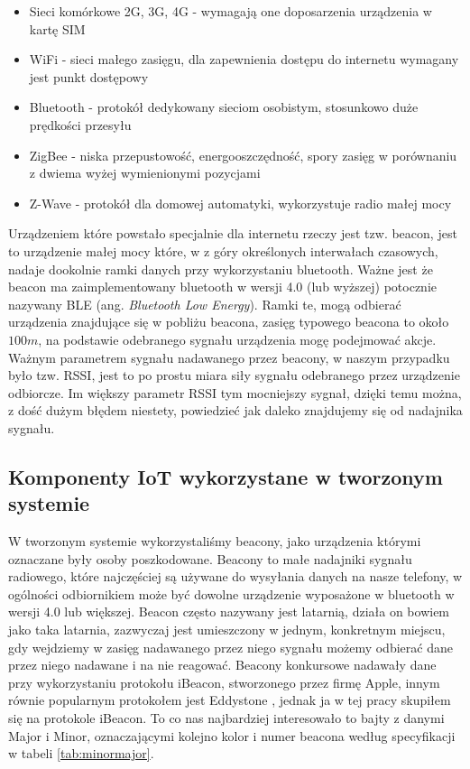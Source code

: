 \begin{itemize}
	\item{Sieci komórkowe 2G, 3G, 4G - wymagają one doposarzenia urządzenia w kartę SIM}
	\item{WiFi - sieci małego zasięgu, dla zapewnienia dostępu do internetu wymagany jest punkt dostępowy}
	\item{Bluetooth - protokół dedykowany sieciom osobistym, stosunkowo duże prędkości przesyłu}
	\item{ZigBee - niska przepustowość, energooszczędność, spory zasięg w porównaniu z dwiema wyżej wymienionymi pozycjami}
	\item{Z-Wave - protokół dla domowej automatyki, wykorzystuje radio małej mocy}
\end{itemize}

Urządzeniem które powstało specjalnie dla internetu rzeczy jest tzw. beacon, jest to urządzenie małej mocy które, w z góry określonych interwałach czasowych, nadaje dookolnie ramki danych przy wykorzystaniu bluetooth. Ważne jest że beacon ma zaimplementowany bluetooth w wersji 4.0 (lub wyższej) potocznie nazywany BLE (ang. \textit{Bluetooth Low Energy}). Ramki te, mogą odbierać urządzenia znajdujące się w pobliżu beacona, zasięg typowego beacona to około $100 m$, na podstawie odebranego sygnału urządzenia mogę podejmować akcje. Ważnym parametrem sygnału nadawanego przez beacony, w naszym przypadku było tzw. RSSI, jest to po prostu miara siły sygnału odebranego przez urządzenie odbiorcze. Im większy parametr RSSI tym mocniejszy sygnał, dzięki temu można, z dość dużym błędem niestety, powiedzieć jak daleko znajdujemy się od nadajnika sygnału.

\subsection{Komponenty IoT wykorzystane w tworzonym systemie}

W tworzonym systemie wykorzystaliśmy beacony, jako urządzenia którymi oznaczane były osoby poszkodowane. Beacony to małe nadajniki sygnału radiowego, które najczęściej są używane do wysyłania danych na nasze telefony, w ogólności odbiornikiem może być dowolne urządzenie wyposażone w bluetooth w wersji 4.0 lub większej. Beacon często nazywany jest latarnią, działa on bowiem jako taka latarnia, zazwyczaj jest umieszczony w jednym, konkretnym miejscu, gdy wejdziemy w zasięg nadawanego przez niego sygnału możemy odbierać dane przez niego nadawane i na nie reagować. Beacony konkursowe nadawały dane przy wykorzystaniu protokołu iBeacon\cite{ibeacon}, stworzonego przez firmę Apple, innym równie popularnym protokołem jest Eddystone \cite{eddystone}, jednak ja w tej pracy skupiłem się na protokole iBeacon. To co nas najbardziej interesowało to bajty z danymi Major i Minor, oznaczającymi kolejno kolor i numer beacona według specyfikacji w tabeli \ref{tab:minormajor}.

